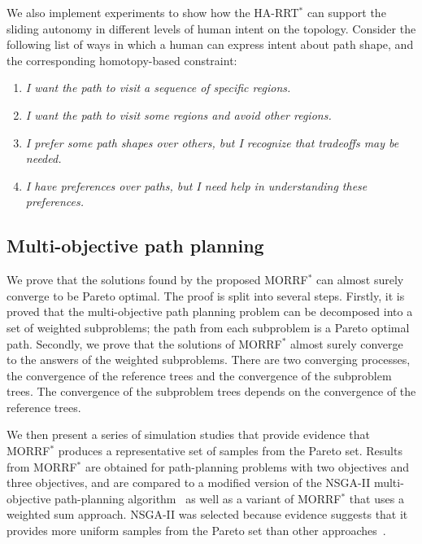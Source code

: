 \documentclass[phd]{byuprop}
\begin{document}
We also implement experiments to show how the HA-RRT$^{*}$ can support the sliding autonomy in different levels of human intent on the topology.
Consider the following list of ways in which a human can express intent about path shape, and the corresponding homotopy-based constraint:
\begin{enumerate}
\item \emph{I want the path to visit a sequence of specific regions.}
\item \emph{I want the path to visit some regions and avoid other regions.}
\item \emph{I prefer some path shapes over others, but I recognize that tradeoffs may be needed.} 
\item \emph{I have preferences over paths, but I need help in understanding these preferences.}
\end{enumerate}

\subsection{Multi-objective path planning}

We prove that the solutions found by the proposed MORRF$^{*}$ can almost surely converge to be Pareto optimal.
The proof is split into several steps.
Firstly, it is proved that the multi-objective path planning problem can be decomposed into a set of weighted subproblems;
the path from each subproblem is a Pareto optimal path.
Secondly, we prove that the solutions of MORRF$^{*}$ almost surely converge to the answers of the weighted subproblems.
There are two converging processes, the convergence of the reference trees and the convergence of the subproblem trees.
The convergence of the subproblem trees depends on the convergence of the reference trees.

We then present a series of simulation studies that provide evidence that MORRF$^{*}$ produces a representative set of samples from the Pareto set.
Results from MORRF$^{*}$ are obtained for path-planning problems with two objectives and three objectives, and are compared to a modified version of the NSGA-II multi-objective path-planning algorithm~\cite{Ahmed2013} as well as a variant of MORRF$^{*}$ that uses a weighted sum approach.
NSGA-II was selected because evidence suggests that it provides more uniform samples from the Pareto set than other approaches~\cite{Deb2002}.  
\end{document}
